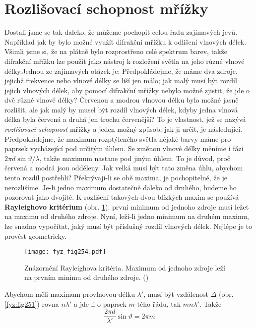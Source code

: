   \section{Rozlišovací schopnost mřížky}\label{fyz:IchapXXXsecIII}
    Dostali jsme se tak daleko, že můžeme pochopit celou řadu zajímavých jevů. Například jak by 
    bylo možné využít difrakční mřížku k odlišení vlnových délek. Všimli jsme si, že na plátně bylo 
    rozprostřeno celé spektrum barev, takže difrakční mřížku lze použít jako nástroj k rozložení 
    světla na jeho různé vlnové délky.Jednou ze zajímavých otázek je: Předpokládejme, že máme dva 
    zdroje, jejichž frekvence nebo vlnové délky se liší jen málo; jak malý musí být rozdíl jejich 
    vlnových délek, aby pomocí difrakční mřížky nebylo možné zjistit, že jde o dvě různé vlnové 
    délky? Červenou a modrou vlnovou délku bylo možné jasně rozlišit, ale jak malý by musel být 
    rozdíl vlnových délek, kdyby jedna vlnová délka byla červená a druhá jen trochu červenější? To 
    je vlastnost, jež se nazývá \emph{rozlišovací schopnost} mřížky a jeden možný způsob, jak ji 
    určit, je následující. Předpokládejme, že maximum rozptýleného světla nějaké barvy máme pro 
    paprsek vycházející pod určitým úhlem. Se změnou vlnové délky měníme i fázi \(2\pi 
    d\sin\vartheta/\lambda\), takže maximum nastane pod jiným úhlem. To je důvod, proč červená a 
    modrá jsou odděleny. Jak velká musí být tato změna úhlu, abychom tento rozdíl postřehli? 
    Překrývají-li se obě maxima, je pochopitelné, že je nerozlišíme. Je-li jedno maximum dostatečně 
    daleko od druhého, budeme ho pozorovat jako dvojité. K rozlišení takových dvou blízkých maxim 
    se používá \textbf{Rayleighovo kritérium} (obr. \ref{fyz:fig254}): první minimum od jednoho 
    zdroje musí ležet na maximu od druhého zdroje. Nyní, leží-li jedno minimum na druhém maximu, 
    lze snadno vypočítat, jaký musí být příslušný rozdíl vlnových délek. Nejlépe je to provést 
    geometricky.
    
    \begin{figure}[ht!] %
      \centering
      \texttt{[image: fyz\_fig254.pdf]}
      \caption{Znázornění Rayleighova kritéria. Maximum od jednoho zdroje leží na prvním minimu od 
               druhého zdroje.
               (\cite[s.~399]{Feynman01})}
      \label{fyz:fig254}
    \end{figure}
    
    Abychom měli maximum provlnovou délku \(\lambda'\), musí být vzdálenost \(\Delta\) (obr. 
    \ref{fyz:fig251}) rovna \(n\lambda'\) a jde-li o paprsek \(m\)-tého řádu, tak \(mn\lambda'\). 
    Takže
    \begin{equation*}
      \dfrac{2\pi d}{\lambda'}\sin\vartheta =2\pi m 
    \end{equation*}
    
